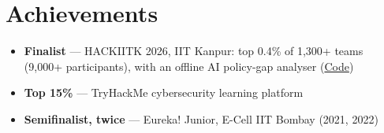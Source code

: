 \documentclass[10pt,a4paper]{article}
\begin{document}
\section{Achievements}
\begin{itemize}
  \item \textbf{Finalist} --- HACKIITK 2026, IIT Kanpur: top 0.4\% of 1,300+ teams (9,000+ participants), with an offline AI policy-gap analyser (\href{https://github.com/rohanbatrain/hackiitk}{Code})
  \item \textbf{Top 15\%} --- TryHackMe cybersecurity learning platform
  \item \textbf{Semifinalist, twice} --- Eureka! Junior, E-Cell IIT Bombay (2021, 2022)
\end{itemize}
\end{document}
